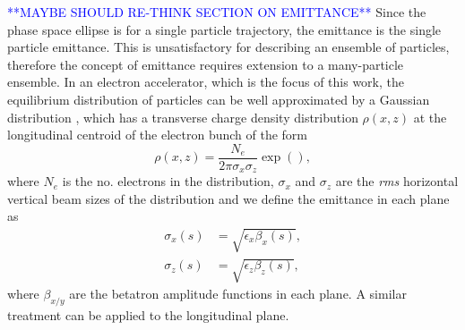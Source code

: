 \documentclass[../main.tex]{subfiles}
\begin{document}
\textcolor{blue}{**MAYBE SHOULD RE-THINK SECTION ON EMITTANCE**}
Since the phase space ellipse is for a single particle trajectory, the emittance is the single particle emittance. This is unsatisfactory for describing an ensemble of particles, therefore the concept of emittance requires extension to a many-particle ensemble. In an electron accelerator, which is the focus of this work, the equilibrium distribution of particles can be well approximated by a Gaussian distribution \cite{wille2000physics}, which has a transverse charge density distribution $\rho\left(x,z\right)$ at the longitudinal centroid of the electron bunch of the form
\begin{equation}
\rho\left(x,z\right) = \frac{N_{e}}{2\pi\sigma_{x}\sigma_{z}}\exp\left(\right),
\label{eq:Gaussian_transverse_charge_distribution}    
\end{equation}
where $N_{e}$ is the no. electrons in the distribution, $\sigma_{x}$ and $\sigma_{z}$ are the \textit{rms} horizontal vertical beam sizes of the distribution and we define the emittance in each plane as
\begin{align}
\sigma_{x}\left(s\right) &= \sqrt{\epsilon_{x}\beta_{x}\left(s\right)}, 
\label{eq:horizontal_emittance} \\
\sigma_{z}\left(s\right) &= \sqrt{\epsilon_{z}\beta_{z}\left(s\right)},
\label{eq:vertical_emittance}
\end{align}
where $\beta_{x/y}$ are the betatron amplitude functions in each plane. A similar treatment can be applied to the longitudinal plane.
\end{document}
